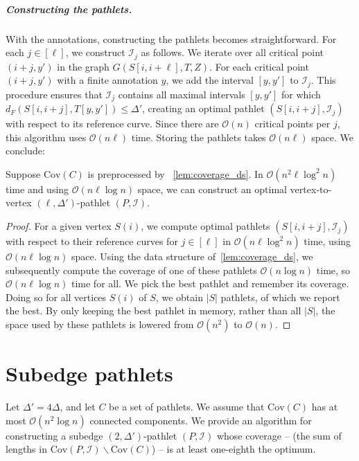 \documentclass[a4paper,UKenglish,cleveref,thm-restate,notab]{lipics-v2021}
\newcommand{\dF}{\ensuremath{d_F}}
\newcommand{\bigO}{\mathcal{O}}
\newcommand{\I}{\mathcal{I}}
\newcommand{\Cov}{\ensuremath{\mathrm{Cov}}}
\begin{document}
\subparagraph*{Constructing the pathlets.}
    With the annotations, constructing the pathlets becomes straightforward.
    For each $j \in [\ell]$, we construct $\I_j$ as follows.
    We iterate over all critical point $(i+j, y')$ in the graph $G(S[i, i+\ell], T, Z)$. 
    For each critical point $(i+j, y')$ with a finite annotation $y$, we add the interval $[y, y']$ to $\I_j$.
    This procedure ensures that $\I_j$ contains all maximal intervals $[y, y']$ for which $\dF(S[i, i+j], T[y, y']) \leq \Delta'$, creating an optimal pathlet $(S[i, i+j], \I_j)$ with respect to its reference curve.
    Since there are $\bigO(n)$ critical points per $j$, this algorithm uses $\bigO(n \ell)$ time.
    Storing the pathlets takes $\bigO(n \ell)$ space.
    We conclude:

    \begin{theorem}
    \label{thm:constructing_vertex-to-vertex}
        Suppose $\Cov(C)$ is preprocessed by ~\cref{lem:coverage_ds}.
        In $\bigO(n^2 \ell \log^2 n)$ time and using $\bigO(n \ell \log n)$ space, we can construct an optimal vertex-to-vertex $(\ell, \Delta')$-pathlet $(P, \I)$.
    \end{theorem}
    \begin{proof}
        For a given vertex $S(i)$, we compute optimal pathlets $(S[i, i+j], \I_j)$ with respect to their reference curves for $j \in [\ell]$ in $\bigO(n \ell \log^2 n)$ time, using $\bigO(n \ell \log n)$ space.
        Using the data structure of~\cref{lem:coverage_ds}, we subsequently compute the coverage of one of these pathlets $\bigO(n \log n)$ time, so $\bigO(n \ell \log n)$ time for all.
        We pick the best pathlet and remember its coverage.
        Doing so for all vertices $S(i)$ of $S$, we obtain $|S|$ pathlets, of which we report the best.
        By only keeping the best pathlet in memory, rather than all $|S|$, the space used by these pathlets is lowered from $\bigO(n^2)$ to $\bigO(n)$.
    \end{proof}

\section{Subedge pathlets}
\label{sec:subedge_pathlets}

    Let $\Delta' = 4\Delta$, and let $C$ be a set of pathlets. We assume that $\Cov(C)$ has at most $\bigO(n^2 \log n)$ connected components. 
    We provide an algorithm for constructing a subedge $(2, \Delta')$-pathlet $(P, \I)$ whose coverage -- (the sum of lengths in $\Cov(P, \I) \backslash \Cov(C)$)  -- is at least one-eighth the optimum.
\end{document}
